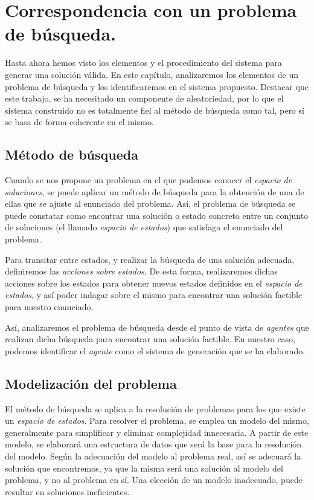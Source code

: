 \chapter{Correspondencia con un problema de búsqueda.}\label{cap:capitulo6}

Hasta ahora hemos visto los elementos y el procedimiento del sistema para generar una solución válida. En este capítulo, analizaremos los elementos de un problema de búsqueda y los identificaremos en el sistema propuesto. Destacar que este trabajo, se ha necesitado un componente de aleatoriedad, por lo que el sistema construido no es totalmente fiel al método de búsqueda como tal, pero sí se basa de forma coherente en el mismo.

\section{Método de búsqueda}

Cuando se nos propone un problema en el que podemos conocer el \emph{espacio de soluciones}, se puede aplicar un método de búsqueda para la obtención de una de ellas que se ajuste al enunciado del problema. Así, el problema de búsqueda se puede constatar como encontrar una solución o estado concreto entre un conjunto de soluciones (el llamado \emph{espacio de estados}) que satisfaga el enunciado del problema.

Para transitar entre estados, y realizar la búsqueda de una solución adecuada, definiremos las \emph{acciones sobre estados}. De esta forma, realizaremos dichas acciones sobre los estados para obtener nuevos estados definidos en el \emph{espacio de estados}, y así poder indagar sobre el mismo para encontrar una solución factible para nuestro enunciado.

Así, analizaremos el problema de búsqueda desde el punto de vista de \emph{agentes} que realizan dicha búsqueda para encontrar una solución factible. En nuestro caso, podemos identificar el \emph{agente} como el sistema de generación que se ha elaborado.

\section{Modelización del problema}

El método de búsqueda se aplica a la resolución de problemas para los que existe un \emph{espacio de estados}. Para resolver el problema, se emplea un modelo del mismo, generalmente para simplificar y eliminar complejidad innecesaria. A partir de este modelo, se elaborará una estructura de datos que será la base para la resolución del modelo. Según la adecuación del modelo al problema real, así se adecuará la solución que encontremos, ya que la misma será una solución al modelo del problema, y no al problema en sí. Una elección de un modelo inadecuado, puede resultar en soluciones ineficientes.

